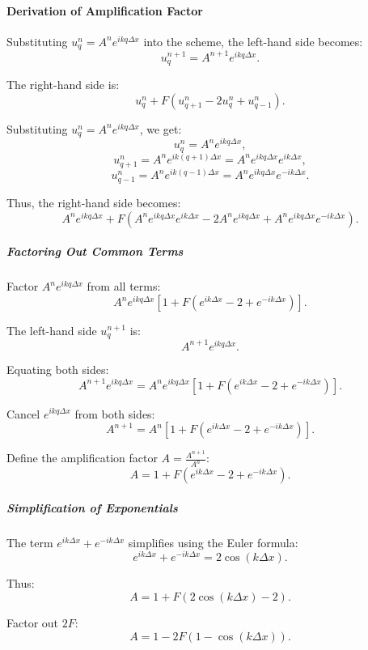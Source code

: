 \documentclass{article}
\begin{document}
			\paragraph{Derivation of Amplification Factor}
			Substituting \( u_q^n = A^n e^{i k q \Delta x} \) into the scheme, the left-hand side becomes:
			\[
			u_q^{n+1} = A^{n+1} e^{i k q \Delta x}.
			\]
			
			The right-hand side is:
			\[
			u_q^n + F \left( u_{q+1}^n - 2u_q^n + u_{q-1}^n \right).
			\]
			
			Substituting \( u_q^n = A^n e^{i k q \Delta x} \), we get:
			\[
			u_q^n = A^n e^{i k q \Delta x},
			\]
			\[
			u_{q+1}^n = A^n e^{i k (q+1) \Delta x} = A^n e^{i k q \Delta x} e^{i k \Delta x},
			\]
			\[
			u_{q-1}^n = A^n e^{i k (q-1) \Delta x} = A^n e^{i k q \Delta x} e^{-i k \Delta x}.
			\]
			
			Thus, the right-hand side becomes:
			\[
			A^n e^{i k q \Delta x} + F \left( A^n e^{i k q \Delta x} e^{i k \Delta x} - 2A^n e^{i k q \Delta x} + A^n e^{i k q \Delta x} e^{-i k \Delta x} \right).
			\]
			
			\subparagraph{Factoring Out Common Terms}
			Factor \( A^n e^{i k q \Delta x} \) from all terms:
			\[
			A^n e^{i k q \Delta x} \left[ 1 + F \left( e^{i k \Delta x} - 2 + e^{-i k \Delta x} \right) \right].
			\]
			
			The left-hand side \( u_q^{n+1} \) is:
			\[
			A^{n+1} e^{i k q \Delta x}.
			\]
			
			Equating both sides:
			\[
			A^{n+1} e^{i k q \Delta x} = A^n e^{i k q \Delta x} \left[ 1 + F \left( e^{i k \Delta x} - 2 + e^{-i k \Delta x} \right) \right].
			\]
			
			Cancel \( e^{i k q \Delta x} \) from both sides:
			\[
			A^{n+1} = A^n \left[ 1 + F \left( e^{i k \Delta x} - 2 + e^{-i k \Delta x} \right) \right].
			\]
			
			Define the amplification factor \( A = \frac{A^{n+1}}{A^n} \):
			\[
			A = 1 + F \left( e^{i k \Delta x} - 2 + e^{-i k \Delta x} \right).
			\]
			
			\subparagraph{Simplification of Exponentials}
			The term \( e^{i k \Delta x} + e^{-i k \Delta x} \) simplifies using the Euler formula:
			\[
			e^{i k \Delta x} + e^{-i k \Delta x} = 2 \cos(k \Delta x).
			\]
			
			Thus:
			\[
			A = 1 + F \left( 2 \cos(k \Delta x) - 2 \right).
			\]
			
			Factor out \( 2F \):
			\[
			A = 1 - 2F \left( 1 - \cos(k \Delta x) \right).
			\]
			
\end{document}
